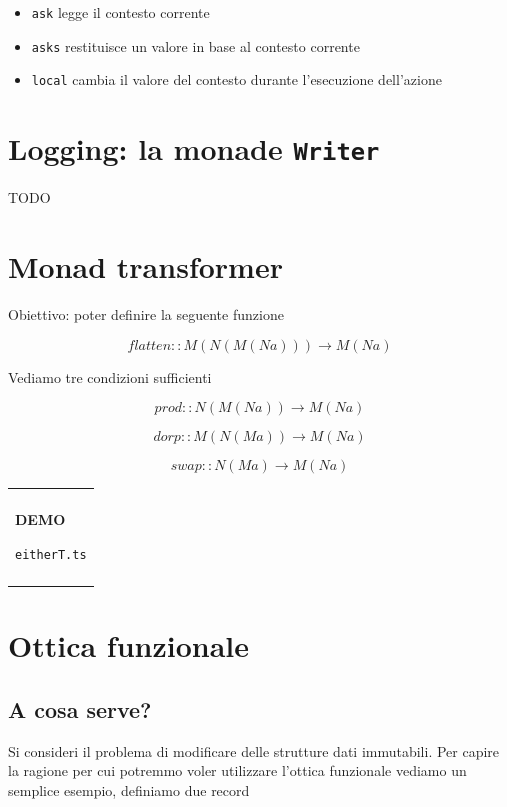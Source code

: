 \documentclass[12pt]{article}
\newenvironment{demo}
    {\begin{center}
    \begin{tabular}{|p{0.9\textwidth}|}
    \hline\\
    }
    {
    \\\\\hline
    \end{tabular}
    \end{center}
    }
\begin{document}
\begin{itemize}
  \item \texttt{ask} legge il contesto corrente
  \item \texttt{asks} restituisce un valore in base al contesto corrente
  \item \texttt{local} cambia il valore del contesto durante l'esecuzione dell'azione
\end{itemize}

\newpage

\section{Logging: la monade \texttt{Writer}}

TODO

\newpage

\section{Monad transformer}

Obiettivo: poter definire la seguente funzione

$$
flatten :: M ( N ( M ( N a ) ) ) \rightarrow M ( N a )
$$

Vediamo tre condizioni sufficienti

$$
prod :: N (M ( N a ) ) \rightarrow M( N a )
$$

$$
dorp :: M (N ( M a ) ) \rightarrow M ( N a )
$$

$$
swap :: N ( M a ) \rightarrow M ( N a )
$$

\begin{demo}
\begin{center}
\textbf{DEMO}

\texttt{eitherT.ts}
\end{center}
\end{demo}

\newpage

\section{Ottica funzionale}

\subsection{A cosa serve?}

Si consideri il problema di modificare delle strutture dati immutabili.
Per capire la ragione per cui potremmo voler utilizzare l'ottica funzionale vediamo un semplice esempio, definiamo due record
\end{document}
